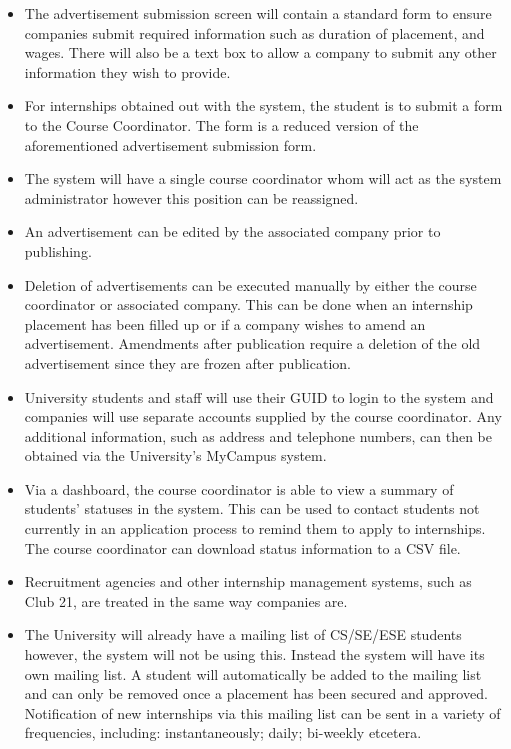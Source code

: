 \documentclass{l3deliverable}
\begin{document}
\begin{itemize}

\item The advertisement submission screen will contain a standard form to
ensure companies submit required information such as duration of placement, and
wages. There will also be a text box to allow a company to submit any other
information they wish to provide.

\item For internships obtained out with the system, the student is to submit
a form to the Course Coordinator. The form is a reduced version of the
aforementioned advertisement submission form.

\item The system will have a single course coordinator whom will act as
the system administrator however this position can be reassigned.

\item An advertisement can be edited by the associated company prior to
publishing.

\item Deletion of advertisements can be executed manually by either the course
coordinator or associated company. This can be done when an internship placement
has been filled up or if a company wishes to amend an advertisement. Amendments
after publication require a deletion of the old advertisement since they are
frozen after publication.

\item University students and staff will use their GUID to login to the system
and companies will use separate accounts supplied by the course coordinator.
Any additional information, such as address and telephone numbers, can then
be obtained via the University's MyCampus system.

\item Via a dashboard, the course coordinator is able to view a summary of
students' statuses in the system. This can be used to contact students not
currently in an application process to remind them to apply to internships. The
course coordinator can download status information to a CSV file.

\item Recruitment agencies and other internship management systems, such as
Club 21, are treated in the same way companies are.

\item The University will already have a mailing list of CS/SE/ESE students
however, the system will not be using this. Instead the system will have its
own mailing list. A student will automatically be added to the mailing list
and can only be removed once a placement has been secured and approved.
Notification of new internships via this mailing list can be sent in a variety
of frequencies, including: instantaneously; daily; bi-weekly etcetera.


\end{itemize}
\end{document}
